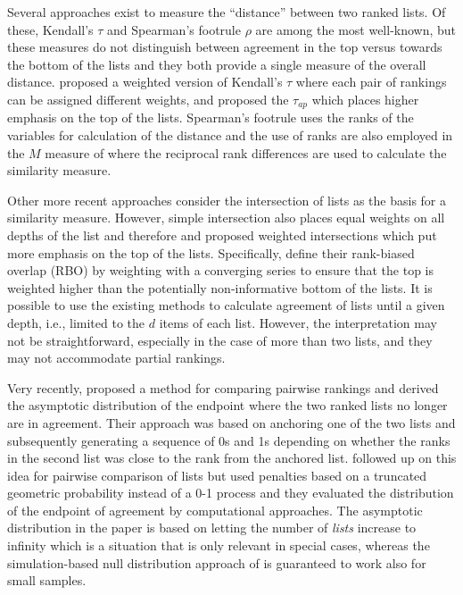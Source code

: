 \documentclass[12pt,a4paper]{article}
\theoremstyle{plain}
\begin{document}
Several approaches exist to measure the ``distance'' between two
ranked lists. Of these, Kendall's $\tau$ \citep{kendall1948} and
Spearman’s footrule $\rho$ \citep{Spearman1910} are among the most
well-known, but these measures do not distinguish between agreement in
the top versus towards the bottom of the lists and they both provide a
single measure of the overall distance. \citet{Shieh1998} proposed a
weighted version of Kendall's $\tau$ where each pair of rankings can
be assigned different weights, and \citet{Yilmaz2008} proposed the
$\tau_{ap}$ which places higher emphasis on the top of the lists.
Spearman’s footrule uses the ranks of the variables for calculation of
the distance and the use of ranks are also employed in the $M$ measure
of \citet{Bar-Ilan2006} where the reciprocal rank differences are used
to calculate the similarity measure.



Other more recent approaches consider the intersection of lists as the basis
for a similarity measure. However, simple intersection also places
equal weights on all depths of the list and therefore \citet{Fagin2003} and
\citet{Webber2010} proposed weighted intersections which put more
emphasis on the top of the lists. 
Specifically, \citet{Webber2010} define their rank-biased overlap
(RBO) by weighting with a converging series to ensure that the top is
weighted higher than the potentially non-informative bottom of the
lists.  It is possible to use the existing methods to calculate
agreement of lists until a given depth, i.e., limited to the $d$ items
of each list. However, the interpretation may not be straightforward,
especially in the case of more than two lists, and they may not
accommodate partial rankings.


Very recently, \citet{hall:schi:2012} proposed a method for comparing
pairwise rankings and derived the asymptotic distribution of the
endpoint where the two ranked lists no longer are in agreement. Their
approach was based on anchoring one of the two lists and subsequently
generating a sequence of 0s and 1s depending on whether the ranks in
the second list was close to the rank from the anchored
list. \citet{samp:verd:2013} followed up on this idea for pairwise
comparison of lists but used penalties based on a truncated geometric
probability instead of a 0-1 process and they evaluated the
distribution of the endpoint of agreement by computational approaches.
The asymptotic distribution in the \citet{hall:schi:2012} paper is
based on letting the number of \emph{lists} increase to infinity which
is a situation that is only relevant in special cases, whereas the
simulation-based null distribution approach of \citet{samp:verd:2013}
is guaranteed to work also for small samples.
\end{document}
